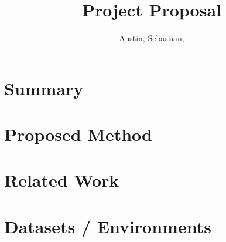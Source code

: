 \documentclass[11pt,a4paper]{article}
\title{Project Proposal}
\author{Austin, Sebastian, }
\date{}
\begin{document}
\maketitle

\section{Summary}

\section{Proposed Method}

\section{Related Work}

\section{Datasets / Environments}
\end{document}
